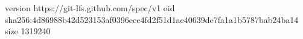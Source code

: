 version https://git-lfs.github.com/spec/v1
oid sha256:4d86988b42d523153af0396ecc4fd2f51d1ae40639de7fa1a1b5787bab24ba14
size 1319240
